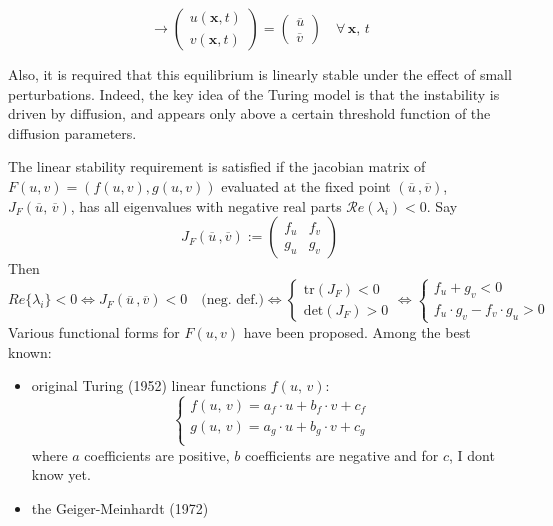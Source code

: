 $$
\rightarrow
\begin{pmatrix}
  u(\mathbf{x}, t) \\
  v(\mathbf{x}, t) 
\end{pmatrix}
= 
\begin{pmatrix}
  \overline{u} \\
  \overline{v}
\end{pmatrix}
\quad \forall \, \mathbf{x},\, t
$$

Also, it is required that this equilibrium is linearly stable under the effect of small perturbations. Indeed, the key idea of the Turing model is that the instability is driven by diffusion, and appears only above a certain threshold function of the diffusion parameters. 


 The linear stability requirement is satisfied if the jacobian matrix of $F(u,v) = (f(u,v), g(u,v))$ evaluated at the fixed point $(\overline{u}\,, \overline{v})$, $J_F(\overline{u},\, \overline{v})$, has all eigenvalues with negative real parts $\mathcal{R}e(\lambda_i)<0$. Say 
 \begin{equation*}
 		J_{F}(\overline{u}\,, \overline{v}) := \begin{pmatrix}
 			f_u & f_v \\
 			g_u & g_v
 		\end{pmatrix}
 \end{equation*}
Then
$$
Re\{\lambda_i\} <0 \iff 	J_{F}(\overline{u}\,, \overline{v})< 0\quad  \text{(neg. def.)} \iff \begin{cases}
		\text{tr}(J_F) < 0 \\
		\text{det}(J_F)>0
	\end{cases}
	\iff \begin{cases}
		f_u + g_v < 0 \\
		f_u\cdot g_v - f_v\cdot g_u>0
	\end{cases}
$$
Various functional forms for $F(u,v)$ have been proposed. Among the best known:

\begin{itemize}
    \item original Turing (1952) linear functions $f(u,\,v)$:
    \begin{equation}
        \begin{cases}
            f(u,\,v) = a_f\cdot u + b_f\cdot v + c_f \\
            g(u,\,v) = a_g\cdot u + b_g\cdot v + c_g \\            
        \end{cases}
    \end{equation}
    where $a$ coefficients are positive, $b$ coefficients are negative and for $c$, I dont know yet.


    \item the Geiger-Meinhardt (1972) 


\end{itemize}


